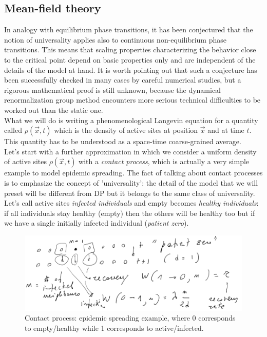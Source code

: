 \documentclass[\main/main.tex]{subfiles}
\begin{document}

\subsection{Mean-field theory}
In analogy with equilibrium phase transitions, it has been conjectured that the notion of universality applies also to continuous non-equilibrium phase transitions. This means that scaling properties characterizing the behavior close to the critical point depend on basic properties only and are independent of the details of the model at hand. It is worth pointing out that such a conjecture has been successfully checked in many cases by
careful numerical studies, but a rigorous mathematical proof is still unknown, because the dynamical renormalization group method encounters more serious technical difficulties to be worked out than the static one. \\

What we will do is writing a phenomenological Langevin equation for a quantity called $\rho(\Vec{x},t)$ which is the density of active sites at position $\Vec{x}$ and at time $t$.
This quantity has to be understood as a space-time coarse-grained average. \\

Let's start with a further approximation in which we consider a uniform density of active sites $\rho(\Vec{x},t)$ with a \textit{contact process}, which is actually a very simple example to model epidemic spreading. The fact of talking about contact processes is to emphasize the concept of 'universality': the detail of the model that we will preset will be different from DP but it belongs to the same class of universality. \\

Let's call active sites \textit{infected individuals} and empty becomes \textit{healthy individuals}: if all individuals stay healthy (empty) then the others will be healthy too but if we have a single initially infected individual (\textit{patient zero}).

\begin{figure}[ht]
    \centering
    \includegraphics[width=\linewidth]{Lectures/Images/qi.png}
    \caption{Contact process: epidemic spreading example, where 0 corresponds to empty/healthy while 1 corresponds to active/infected.}
    \label{fig:pandemic}
\end{figure}
\end{document}
